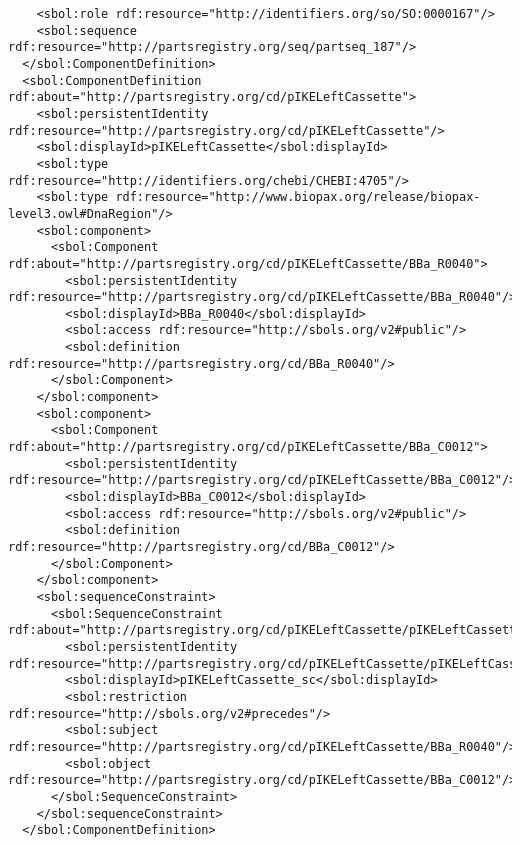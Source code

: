 \begin{minipage}{0.95\textwidth}
\begin{lstlisting}
    <sbol:role rdf:resource="http://identifiers.org/so/SO:0000167"/>
    <sbol:sequence rdf:resource="http://partsregistry.org/seq/partseq_187"/>
  </sbol:ComponentDefinition>
  <sbol:ComponentDefinition rdf:about="http://partsregistry.org/cd/pIKELeftCassette">
    <sbol:persistentIdentity rdf:resource="http://partsregistry.org/cd/pIKELeftCassette"/>
    <sbol:displayId>pIKELeftCassette</sbol:displayId>
    <sbol:type rdf:resource="http://identifiers.org/chebi/CHEBI:4705"/>
    <sbol:type rdf:resource="http://www.biopax.org/release/biopax-level3.owl#DnaRegion"/>
    <sbol:component>
      <sbol:Component rdf:about="http://partsregistry.org/cd/pIKELeftCassette/BBa_R0040">
        <sbol:persistentIdentity rdf:resource="http://partsregistry.org/cd/pIKELeftCassette/BBa_R0040"/>
        <sbol:displayId>BBa_R0040</sbol:displayId>
        <sbol:access rdf:resource="http://sbols.org/v2#public"/>
        <sbol:definition rdf:resource="http://partsregistry.org/cd/BBa_R0040"/>
      </sbol:Component>
    </sbol:component>
    <sbol:component>
      <sbol:Component rdf:about="http://partsregistry.org/cd/pIKELeftCassette/BBa_C0012">
        <sbol:persistentIdentity rdf:resource="http://partsregistry.org/cd/pIKELeftCassette/BBa_C0012"/>
        <sbol:displayId>BBa_C0012</sbol:displayId>
        <sbol:access rdf:resource="http://sbols.org/v2#public"/>
        <sbol:definition rdf:resource="http://partsregistry.org/cd/BBa_C0012"/>
      </sbol:Component>
    </sbol:component>
    <sbol:sequenceConstraint>
      <sbol:SequenceConstraint rdf:about="http://partsregistry.org/cd/pIKELeftCassette/pIKELeftCassette_sc">
        <sbol:persistentIdentity rdf:resource="http://partsregistry.org/cd/pIKELeftCassette/pIKELeftCassette_sc"/>
        <sbol:displayId>pIKELeftCassette_sc</sbol:displayId>
        <sbol:restriction rdf:resource="http://sbols.org/v2#precedes"/>
        <sbol:subject rdf:resource="http://partsregistry.org/cd/pIKELeftCassette/BBa_R0040"/>
        <sbol:object rdf:resource="http://partsregistry.org/cd/pIKELeftCassette/BBa_C0012"/>
      </sbol:SequenceConstraint>
    </sbol:sequenceConstraint>
  </sbol:ComponentDefinition>
\end{lstlisting}
\end{minipage}

\clearpage

